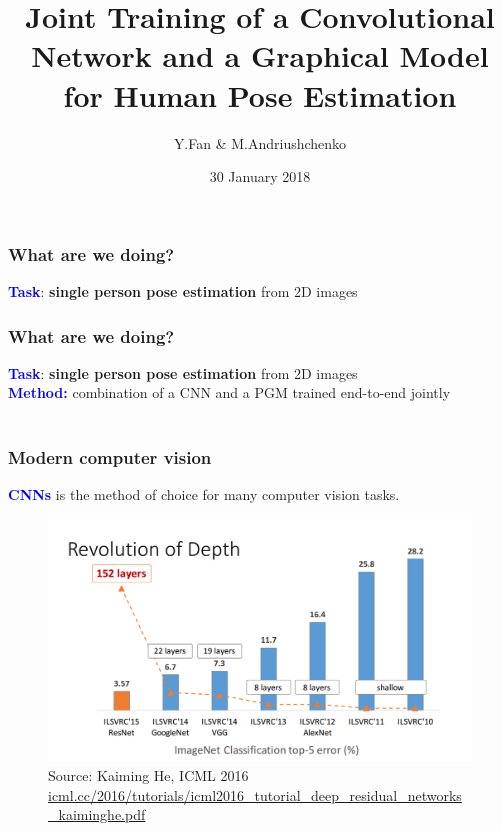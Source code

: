 \documentclass{beamer}
\title[Joint Training of CNN and PGM for HPE]{\textbf{Joint Training of a Convolutional Network and a Graphical Model for Human Pose Estimation}}
\subtitle{}
\author{Y.Fan \& M.Andriushchenko}
\institute{Saarland Univ.}
\date{30 January 2018}
\newcommand\blue[1]{\textcolor{blue}{\textbf{#1}}}
\begin{document}
	
	\begin{frame}
		\titlepage
	\end{frame}


	\begin{frame}[c]
		\frametitle{What are we doing?}
		\begin{center}
			\blue{Task}: \textbf{single person pose estimation} from 2D images \\
		\end{center}
	\end{frame}
	
	\begin{frame}[c]
		\frametitle{What are we doing?}
		\begin{center}
			\blue{Task}: \textbf{single person pose estimation} from 2D images \\
			\blue{Method:} combination of a CNN and a PGM trained end-to-end jointly \\ \ \\
		\end{center}
	\end{frame}


    \begin{frame}[c]
        \frametitle{Modern computer vision}
        \begin{center}
        	\blue{CNNs} is the method of choice for many computer vision tasks. \\            
            \begin{figure}
            	\includegraphics[scale=0.25]{cnn_power.png} \\
            	\scriptsize Source: Kaiming He, ICML 2016  \url{icml.cc/2016/tutorials/icml2016_tutorial_deep_residual_networks_kaiminghe.pdf}
            \end{figure} 
        \end{center}
    \end{frame}
    
\end{document}

